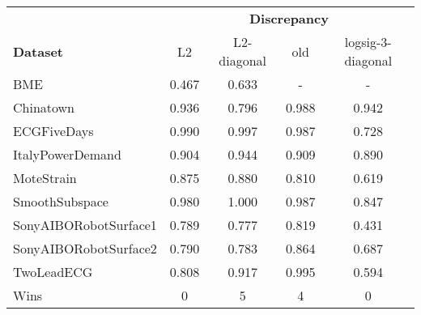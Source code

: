 \begin{tabular}{lcccc}
\toprule
& \multicolumn{4}{c}{\textbf{Discrepancy}} \\
\textbf{Dataset} &    L2 &  L2-diagonal &   old &  logsig-3-diagonal \\
\midrule
BME                   & 0.467 &        0.633 &     - &                  - \\
Chinatown             & 0.936 &        0.796 & 0.988 &              0.942 \\
ECGFiveDays           & 0.990 &        0.997 & 0.987 &              0.728 \\
ItalyPowerDemand      & 0.904 &        0.944 & 0.909 &              0.890 \\
MoteStrain            & 0.875 &        0.880 & 0.810 &              0.619 \\
SmoothSubspace        & 0.980 &        1.000 & 0.987 &              0.847 \\
SonyAIBORobotSurface1 & 0.789 &        0.777 & 0.819 &              0.431 \\
SonyAIBORobotSurface2 & 0.790 &        0.783 & 0.864 &              0.687 \\
TwoLeadECG            & 0.808 &        0.917 & 0.995 &              0.594 \\ 
\midrule
Wins &   0 &            5 &    4 &                  0 \\
\bottomrule
\end{tabular}
